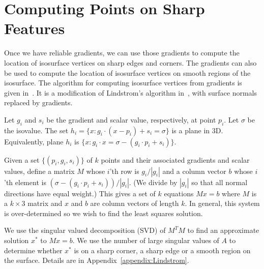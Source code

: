 



%
%

\section{Computing Points on Sharp Features}
\label{sec:computeSharpPoints}

Once we have reliable gradients,
we can use those gradients to compute the location of isosurface vertices 
on sharp edges and corners.
The gradients can also be used to compute the location 
of isosurface vertices on smooth regions of the isosurface.
The algorithm for computing isosurface vertices from gradients
is given in~\cite{bw-cisec-13}.
It is a modification of Lindstrom's algorithm in~\cite{l-oslpm-00},
with surface normals replaced by gradients.

Let $g_i$ and $s_i$ be the gradient and scalar value, respectively,
at point $p_i$.
Let $\sigma$ be the isovalue.
The set $h_i = \{x : g_i \cdot (x-p_i) + s_i = \sigma \}$ is a plane in 3D.
Equivalently, plane $h_i$ is
$\{x : g_i \cdot x = \sigma - (g_i \cdot p_i + s_i) \}$.

Given a set $\{(p_i,g_i,s_i)\}$ of $k$ points and their associated
gradients and scalar values,
define a matrix $M$ whose $i$'th row is $g_i/|g_i|$
and a column vector $b$ whose $i$'th element is 
$(\sigma - (g_i \cdot p_i + s_i))/|g_i|$.
(We divide by $|g_i|$ so that all normal directions have equal weight.)
This gives a set of $k$ equations $Mx = b$
where $M$ is a $k\times3$ matrix and $x$ and $b$ are column vectors
of length $k$.
In general, this system is over-determined so we wish to find
the least squares solution.

We use the singular valued decomposition (SVD) of $M^T M$
to find an approximate solution $x^*$ to $M x = b$.
We use the number of large singular values of $A$
to determine whether $x^*$ is on a sharp corner,
a sharp edge or a smooth region on the surface.
Details are in Appendix~\ref{appendix:Lindstrom}.

